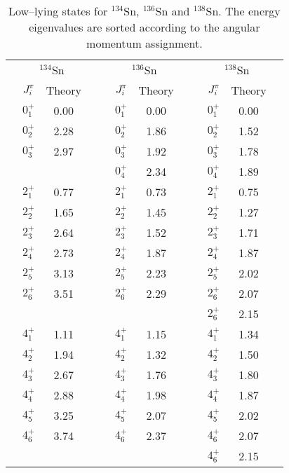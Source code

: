 \documentclass[twoside,12pt]{article}
\begin{document}
\begin{table}[htbp]
\caption{Low--lying states for  $^{134}$Sn, $^{136}$Sn and $^{138}$Sn.
The energy eigenvalues are sorted according to the angular momentum assignment.}
\label{tab:even_isotopes}
\begin{center}
\begin{tabular}{|cccc|cccc|cccc|}
\hline
\multicolumn{4}{|c|}{$^{134}$Sn} & \multicolumn{4}{|c|}{ $^{136}$Sn}& \multicolumn{4}{|c|}{ $^{138}$Sn}\\
&{$J^{\pi}_i$}&Theory&&&{$J^{\pi}_i$}&Theory&&&{$J^{\pi}_i$}&Theory& \\

\hline
& $0^{+}_{1}$ & 0.00   &&   &$0^{+}_{1}$ & 0.00   &&   &$0^{+}_{1}$ & 0.00   &\\
& $0^{+}_{2}$ & 2.28   &&   &$0^{+}_{2}$ & 1.86   &&   &$0^{+}_{2}$ & 1.52   &\\
& $0^{+}_{3}$ & 2.97   &&   &$0^{+}_{3}$ & 1.92   &&   &$0^{+}_{3}$ & 1.78   &\\
&             &        &&   &$0^{+}_{4}$ & 2.34   &&   &$0^{+}_{4}$ & 1.89   &\\

\hline
& $2^{+}_{1}$ & 0.77   &&   &$2^{+}_{1}$ & 0.73   &&   &$2^{+}_{1}$ & 0.75   &\\
& $2^{+}_{2}$ & 1.65   &&   &$2^{+}_{2}$ & 1.45   &&   &$2^{+}_{2}$ & 1.27   &\\
& $2^{+}_{3}$ & 2.64   &&   &$2^{+}_{3}$ & 1.52   &&   &$2^{+}_{3}$ & 1.71   &\\
& $2^{+}_{4}$ & 2.73   &&   &$2^{+}_{4}$ & 1.87   &&   &$2^{+}_{4}$ & 1.87   &\\
& $2^{+}_{5}$ & 3.13   &&   &$2^{+}_{5}$ & 2.23   &&   &$2^{+}_{5}$ & 2.02   &\\
& $2^{+}_{6}$ & 3.51   &&   &$2^{+}_{6}$ & 2.29   &&   &$2^{+}_{6}$ & 2.07   &\\
&             &        &&   &            &        &&   &$2^{+}_{6}$ & 2.15   &\\

\hline
& $4^{+}_{1}$ & 1.11   &&   &$4^{+}_{1}$ & 1.15   &&   &$4^{+}_{1}$ & 1.34   &\\
& $4^{+}_{2}$ & 1.94   &&   &$4^{+}_{2}$ & 1.32   &&   &$4^{+}_{2}$ & 1.50   &\\
& $4^{+}_{3}$ & 2.67   &&   &$4^{+}_{3}$ & 1.76   &&   &$4^{+}_{3}$ & 1.80   &\\
& $4^{+}_{4}$ & 2.88   &&   &$4^{+}_{4}$ & 1.98   &&   &$4^{+}_{4}$ & 1.87   &\\
& $4^{+}_{5}$ & 3.25   &&   &$4^{+}_{5}$ & 2.07   &&   &$4^{+}_{5}$ & 2.02   &\\
& $4^{+}_{6}$ & 3.74   &&   &$4^{+}_{6}$ & 2.37   &&   &$4^{+}_{6}$ & 2.07   &\\
&             &        &&   &            &        &&   &$4^{+}_{6}$ & 2.15   &\\


\end{tabular}
\end{center}
\end{table}
\end{document}

